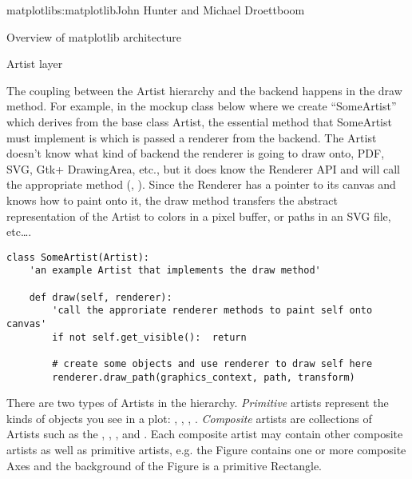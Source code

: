 \begin{aosachapter}{matplotlib}{s:matplotlib}{John Hunter and Michael Droettboom}
\begin{aosasect1}{Overview of matplotlib architecture}
\begin{aosasect2}{Artist layer}


The coupling between the Artist hierarchy and the backend happens in
the draw method.  For example, in the mockup class below where we
create ``SomeArtist'' which derives from the base class Artist, the
essential method that SomeArtist must implement is  which
is passed a renderer from the backend.  The Artist doesn't know what
kind of backend the renderer is going to draw onto, PDF, SVG, Gtk+
DrawingArea, etc., but it does know the Renderer API and will call the
appropriate method (, ).  Since the
Renderer has a pointer to its canvas and knows how to paint onto it,
the draw method transfers the abstract representation of the Artist to
colors in a pixel buffer, or paths in an SVG file, etc\dots{}.

\begin{verbatim}
class SomeArtist(Artist):
    'an example Artist that implements the draw method'

    def draw(self, renderer):
        'call the approriate renderer methods to paint self onto canvas'
        if not self.get_visible():  return

        # create some objects and use renderer to draw self here
        renderer.draw_path(graphics_context, path, transform)

\end{verbatim}

There are two types of Artists in the hierarchy. \emph{Primitive}
artists represent the kinds of objects you see in a plot:
, , , .
\emph{Composite} artists are collections of Artists such as the
, , , and .  Each
composite artist may contain other composite artists as well as
primitive artists, e.g. the Figure contains one or more composite Axes
and the background of the Figure is a primitive Rectangle.


\end{aosasect2}
\end{aosasect1}
\end{aosachapter}
